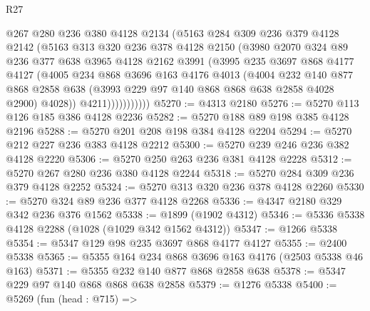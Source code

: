\begin{lexlean}{R27}
\begin{coremodule}
                  @267
                  @280
                  @236
                  @380
                  @4128
                  @2134
                  (@5163
                    @284
                    @309
                    @236
                    @379
                    @4128
                    @2142
                    (@5163
                      @313
                      @320
                      @236
                      @378
                      @4128
                      @2150
                      (@3980
                        @2070
                        @324
                        @89
                        @236
                        @377
                        @638
                        @3965
                        @4128
                        @2162
                        @3991
                        (@3995
                          @235
                          @3697
                          @868
                          @4177
                          @4127
                          (@4005
                            @234
                            @868
                            @3696
                            @163
                            @4176
                            @4013
                            (@4004
                              @232
                              @140
                              @877
                              @868
                              @2858
                              @638
                              (@3993 @229 @97 @140 @868 @868 @638 @2858 @4028 @2900)
                              @4028))
                          @4211)))))))))))
@5270 := @4313 @2180
@5276 := @5270 @113 @126 @185 @386 @4128 @2236
@5282 := @5270 @188 @89 @198 @385 @4128 @2196
@5288 := @5270 @201 @208 @198 @384 @4128 @2204
@5294 := @5270 @212 @227 @236 @383 @4128 @2212
@5300 := @5270 @239 @246 @236 @382 @4128 @2220
@5306 := @5270 @250 @263 @236 @381 @4128 @2228
@5312 := @5270 @267 @280 @236 @380 @4128 @2244
@5318 := @5270 @284 @309 @236 @379 @4128 @2252
@5324 := @5270 @313 @320 @236 @378 @4128 @2260
@5330 := @5270 @324 @89 @236 @377 @4128 @2268
@5336 := @4347 @2180 @329 @342 @236 @376 @1562
@5338 := @1899 (@1902 @4312)
@5346 := @5336 @5338 @4128 @2288 (@1028 (@1029 @342 @1562 @4312))
@5347 := @1266 @5338
@5354 := @5347 @129 @98 @235 @3697 @868 @4177 @4127
@5355 := @2400 @5338
@5365 := @5355 @164 @234 @868 @3696 @163 @4176 (@2503 @5338 @46 @163)
@5371 := @5355 @232 @140 @877 @868 @2858 @638
@5378 := @5347 @229 @97 @140 @868 @868 @638 @2858
@5379 := @1276 @5338
@5400 := @5269
    (fun (head : @715) =>

\end{coremodule}
\end{lexlean}
